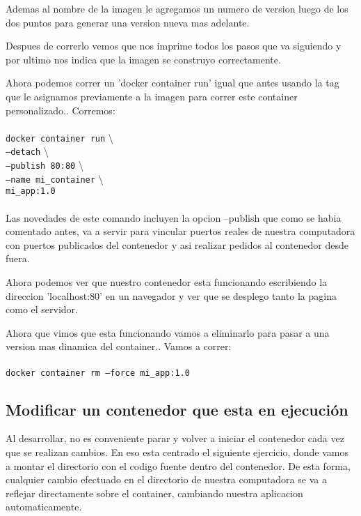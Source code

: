 \documentclass[11pt]{article} %
\begin{document}
Ademas al nombre de la imagen le agregamos un numero de version luego de los dos puntos para generar una version nueva mas adelante.

Despues de correrlo vemos que nos imprime todos los pasos que va siguiendo y por ultimo nos indica que la imagen se construyo correctamente.

Ahora podemos correr un 'docker container run' igual que antes usando la tag que le asignamos previamente a la imagen para correr este container personalizado.. Corremos: \\ \\
	\texttt{docker container run} \textbackslash \\
	\texttt{--detach} \textbackslash \\
	\texttt{--publish 80:80} \textbackslash \\
	\texttt{--name mi\_container} \textbackslash \\
	\texttt{mi\_app:1.0} \\ \\

Las novedades de este comando incluyen la opcion --publish que como se habia comentado antes, va a servir para vincular puertos reales de nuestra computadora con puertos publicados del contenedor y asi realizar pedidos al contenedor desde fuera.

Ahora podemos ver que nuestro contenedor esta funcionando escribiendo la direccion 'localhost:80' en un navegador y ver que se desplego tanto la pagina como el servidor.

Ahora que vimos que esta funcionando vamos a eliminarlo para pasar a una version mas dinamica del container.. Vamos a correr:\\ \\
	\texttt{docker container rm --force mi\_app:1.0} \\

\subsection{Modificar un contenedor que esta en ejecución}

Al desarrollar, no es conveniente parar y volver a iniciar el contenedor cada vez que se realizan cambios. En eso esta centrado el siguiente ejercicio, donde vamos a montar el directorio con el codigo fuente dentro del contenedor. De esta forma, cualquier cambio efectuado en el directorio de nuestra computadora se va a reflejar directamente sobre el container, cambiando nuestra aplicacion automaticamente.
\end{document}
